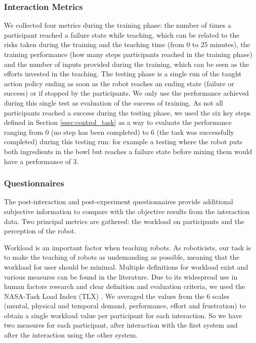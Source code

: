 \subsubsection{Interaction Metrics}

We collected four metrics during the training phase: the number of times a participant reached a failure state while teaching, which can be related to the risks taken during the training and the teaching time (from 0 to 25 minutes), the training performance (how many steps participants reached in the training phase) and the number of inputs provided during the training, which can be seen as the efforts invested in the teaching. The testing phase is a single run of the taught action policy ending as soon as the robot reaches an ending state (failure or success) or if stopped by the participants. We only use the performance achieved during this single test as evaluation of the success of training. As not all participants reached a success during the testing phase, we used the six key steps defined in Section \ref{ssec:control_task} as a way to evaluate the performance ranging from 0 (no step has been completed) to 6 (the task was successfully completed) during this testing run: for example a testing where the robot puts both ingredients in the bowl but reaches a failure state before mixing them would have a performance of 3.

\subsubsection{Questionnaires}

The post-interaction and post-experiment questionnaires provide additional subjective information to compare with the objective results from the interaction data. Two principal metrics are gathered: the workload on participants and the perception of the robot. 

Workload is an important factor when teaching robots. As roboticists, our task is to make the teaching of robots as undemanding as possible, meaning that the workload for user should be minimal. Multiple definitions for workload exist and various measures can be found in the literature. Due to its widespread use in human factors research and clear definition and evaluation criteria, we used the NASA-Task Load Index (TLX) \citep{hart1988development}. We averaged the values from the 6 scales (mental, physical and temporal demand, performance, effort and frustration) to obtain a single workload value per participant for each interaction. So we have two measures for each participant, after interaction with the first system and after the interaction using the other system.

